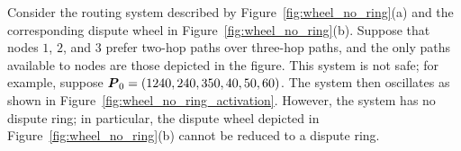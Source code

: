 \begin{example}
Consider the routing system described by Figure~\ref{fig:wheel_no_ring}(a)
and the corresponding dispute wheel in Figure~\ref{fig:wheel_no_ring}(b).
Suppose that nodes $1$, $2$, and $3$ prefer two-hop paths over
three-hop paths, and the only paths available to nodes are those depicted
in the figure.  This system is not safe; for
example, suppose $\boldsymbol{P}_0 = (1240, 240, 350, 40, 50, 60)$.  The system
then oscillates as shown in Figure~\ref{fig:wheel_no_ring_activation}.
However, the system has no dispute ring; in particular, the dispute
wheel depicted in 
Figure~\ref{fig:wheel_no_ring}(b) cannot be reduced to a dispute ring.
\end{example}




